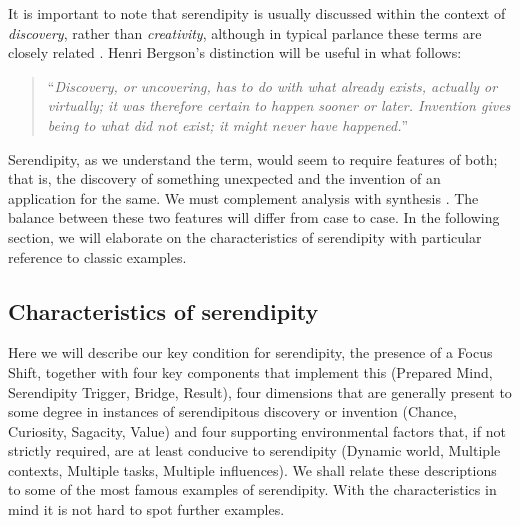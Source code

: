 It is important to note that serendipity is usually discussed within
the context of \emph{discovery}, rather than \emph{creativity},
although in typical parlance these terms are closely related
\cite{jordanous12jims}.  Henri Bergson's distinction will be useful in
what follows:
\begin{quote}
``\emph{Discovery, or uncovering, has to do with what already exists,
    actually or virtually; it was therefore certain to happen sooner
    or later.  Invention gives being to what did not exist; it might
    never have happened.}''~\cite{bergson2010creative}
\end{quote}
Serendipity, as we understand the term, would seem to require features
of both; that is, the discovery of something unexpected and the
invention of an application for the same.  We must complement analysis
with synthesis \cite{delanda1993virtual}.  The balance between these
two features will differ from case to case.  In the following section,
we will elaborate on the characteristics of serendipity with
particular reference to classic examples.

\subsection{Characteristics of serendipity}\label{sec:characteristics}

Here we will describe our key condition for serendipity, the presence
of a Focus Shift, together with four key components that implement
this (Prepared Mind, Serendipity Trigger, Bridge, Result), four
dimensions that are generally present to some degree in instances of
serendipitous discovery or invention (Chance, Curiosity, Sagacity,
Value) and four supporting environmental factors that, if not strictly
required, are at least conducive to serendipity (Dynamic world,
Multiple contexts, Multiple tasks, Multiple influences). We shall relate these descriptions to some of the most famous examples of serendipity.
With the characteristics in mind it is not hard to spot further examples.

